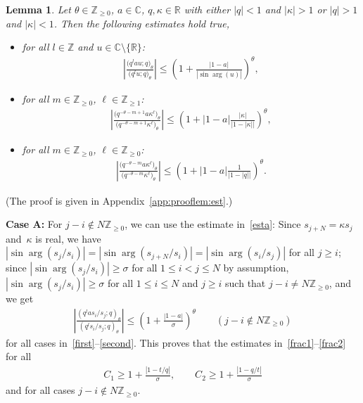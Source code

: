 \documentclass[11pt]{article}
\numberwithin{equation}{section}
\newtheorem{Lemma}[Theorem]{Lemma}
\newcommand{\R}{{\mathbb R}}
\newcommand{\C}{{\mathbb C}}
\newcommand{\Z}{{\mathbb Z}}
\begin{document}
\begin{Lemma}\label{lem:est}
Let $\theta\in\Z_{\geq 0}$, $a\in\C$, $q, \kappa\in\R$ with either $|q|<1$ and $|\kappa|>1$ or $|q|>1$ and $|\kappa|<1$. Then the following estimates hold true,
\begin{itemize}\itemsep=0pt
\item[$(a)$] for all $l\in\Z$ and $u\in\C\setminus\{\R\}$:
\begin{gather}\label{esta}
\left| \frac{\big(q^{l}au;q\big)_\theta}{\big(q^l u;q\big)_\theta}\right|\leq \left( 1 + \frac{|1-a|}{|\sin\arg(u)|}\right)^\theta\!,
\end{gather}
\item[$(b)$] for all $m\in\Z_{\geq 0}$, $\ell\in\Z_{\geq 1}$:
\begin{gather}\label{estb}
\left|\frac{\big( q^{-\theta-m+1} a \kappa^\ell \big)_\theta}{\big(q^{-\theta-m+1} \kappa^\ell \big)_\theta} \right| \leq \left(1+|1-a|\frac{|\kappa|}{|1-|\kappa||} \right)^\theta\!,
\end{gather}
\item[$(c)$] for all $m\in\Z_{\geq 0}$, $\ell\in\Z_{\geq 0}$:
\begin{gather}\label{estc}
\left|\frac{\big( q^{-\theta-m} a \kappa^\ell \big)_\theta}{\big(q^{-\theta-m} \kappa^\ell \big)_\theta} \right| \leq \left(1+|1-a|\frac{1}{|1-|q||} \right)^\theta\!.
\end{gather}
\end{itemize}
\end{Lemma}
(The proof is given in Appendix~\ref{app:prooflem:est}.)

{\bf Case A:} For $j-i\notin N\Z_{\geq 0}$, we can use the estimate in~\eqref{esta}:
Since $s_{j+N}=\kappa s_j$ and~$\kappa$ is real, we have $|\sin\arg(s_j/s_i)|=|\sin\arg(s_{j+N}/s_i)|=|\sin\arg(s_i/s_j)|$ for all $j\geq i$;
since $|\sin\arg(s_j/s_i)|\geq \sigma$ for all $1\leq i<j\leq N$ by assumption, $|\sin\arg(s_j/s_i)|\geq \sigma$ for all $1\leq i\leq N$ and $j\geq i$ such that $j-i\neq N\Z_{\geq 0}$, and we get
\begin{gather*}
\left|\frac{(q^{l}as_i/s_j;q)_\theta}{(q^l s_i/s_j;q)_\theta}\right| \leq \left(1+\frac{|1-a|}{\sigma} \right)^\theta\qquad
(j-i\notin N\Z_{\geq 0})
\end{gather*}
for all cases in~\eqref{first}--\eqref{second}. This proves that the estimates in~\eqref{frac1}--\eqref{frac2} for all
\begin{gather}
\label{C1C2A}
C_1\geq 1+\frac{|1-t/q|}{\sigma},\qquad
C_2\geq 1+\frac{|1-q/t|}{\sigma}
\end{gather}
and for all cases $j-i\notin N\Z_{\geq 0}$.
\end{document}
